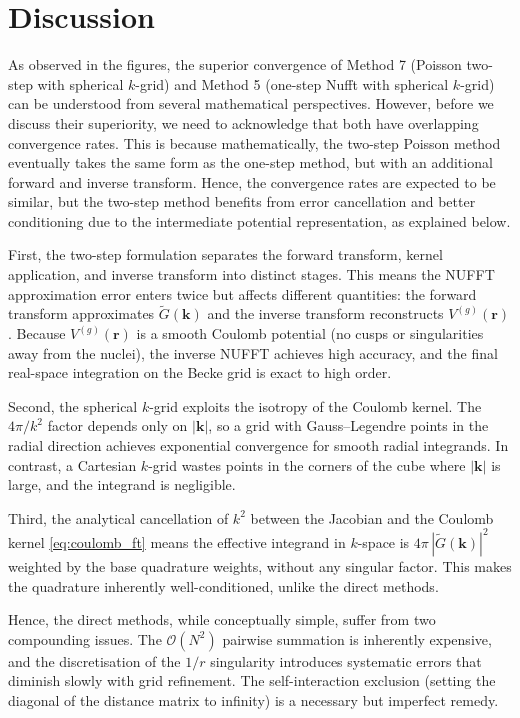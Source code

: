 \documentclass[12pt,a4paper]{article}
\begin{document}
\section{Discussion}
\label{sec:discussion}
As observed in the figures, the superior convergence of Method 7 (Poisson two-step with spherical $k$-grid) and Method 5 (one-step Nufft with spherical $k$-grid) can be understood from several mathematical perspectives. However, before we discuss their superiority, we need to acknowledge that both have overlapping convergence rates. This is because mathematically, the two-step Poisson method eventually takes the same form as the one-step method, but with an additional forward and inverse transform. Hence, the convergence rates are expected to be similar, but the two-step method benefits from error cancellation and better conditioning due to the intermediate potential representation, as explained below.

First, the two-step formulation separates the forward transform, kernel application, and inverse transform into distinct stages. This means the NUFFT approximation error enters twice but affects different quantities: the forward transform approximates $\widetilde{G}(\mathbf{k})$ and the inverse transform reconstructs $V^{(g)}(\mathbf{r})$. Because $V^{(g)}(\mathbf{r})$ is a smooth Coulomb potential (no cusps or singularities away from the nuclei), the inverse NUFFT achieves high accuracy, and the final real-space integration on the Becke grid is exact to high order.

Second, the spherical $k$-grid exploits the isotropy of the Coulomb kernel. The $4\pi/k^2$ factor depends only on $|\mathbf{k}|$, so a grid with Gauss--Legendre points in the radial direction achieves exponential convergence for smooth radial integrands. In contrast, a Cartesian $k$-grid wastes points in the corners of the cube where $|\mathbf{k}|$ is large, and the integrand is negligible.

Third, the analytical cancellation of $k^2$ between the Jacobian and the Coulomb kernel \eqref{eq:coulomb_ft} means the effective integrand in $k$-space is $4\pi\,|\widetilde{G}(\mathbf{k})|^2$ weighted by the base quadrature weights, without any singular factor. This makes the quadrature inherently well-conditioned, unlike the direct methods.

Hence, the direct methods, while conceptually simple, suffer from two compounding issues. The $\mathcal{O}(N^2)$ pairwise summation is inherently expensive, and the discretisation of the $1/r$ singularity introduces systematic errors that diminish slowly with grid refinement. The self-interaction exclusion (setting the diagonal of the distance matrix to infinity) is a necessary but imperfect remedy.
\end{document}
